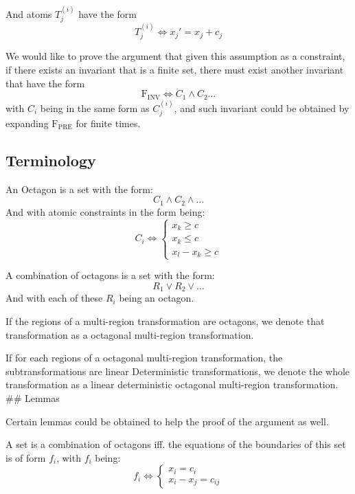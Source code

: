 \documentclass[letterpaper,]{article}
\providecommand{\tightlist}{%
  \setlength{\itemsep}{0pt}\setlength{\parskip}{0pt}}
\begin{document}
And atoms \(T_j^{(i)}\) have the form
\[T_j^{(i)} \Leftrightarrow x_j' = x_j + c_j \]

We would like to prove the argument that given this assumption as a
constraint, if there exists an invariant that is a finite set, there
must exist another invariant that have the form
\[\mathrm{F_{INV}}\Leftrightarrow C_1 \land C_2 \dots \] with \(C_i\)
being in the same form as \(C_j^{(i)}\), and such invariant could be
obtained by expanding \(\mathrm{F_{PRE}}\) for finite times.

\hypertarget{terminology}{%
\subsection{Terminology}\label{terminology}}

\begin{description}
\tightlist
\item[Octagon]
An Octagon is a set with the form: \[ C_1 \land C_2 \land \dots\] And
with atomic constraints in the form being: \[ C_i \Leftrightarrow
\begin{cases}x_k \ge c   \\ x_k \le c \\ x_l - x_k \ge c \end{cases}\]
\item[Combination of Octagons]
A combination of octagons is a set with the form:
\[R_1 \lor R_2 \lor \dots \] And with each of these \(R_i\) being an
octagon.
\item[Octagonal Multi-region Transformation]
If the regions of a multi-region transformation are octagons, we denote
that transformation as a octagonal multi-region transformation.
\item[Linear Deterministic Octagonal Multi-region Transformation]
If for each regions of a octagonal multi-region transformation, the
subtransformations are linear Deterministic transformations, we denote
the whole transformation as a linear deterministic octagonal
multi-region transformation. \#\# Lemmas
\end{description}

Certain lemmas could be obtained to help the proof of the argument as
well.

\begin{description}
\tightlist
\item[Lemma 1]
A set is a combination of octagons iff. the equations of the boundaries
of this set is of form \(f_i\), with \(f_i\) being:
\[ f_i \Leftrightarrow \begin{cases} x_i = c_i \\ x_i - x_j = c_{ij}\end{cases}\]
\end{description}
\end{document}
